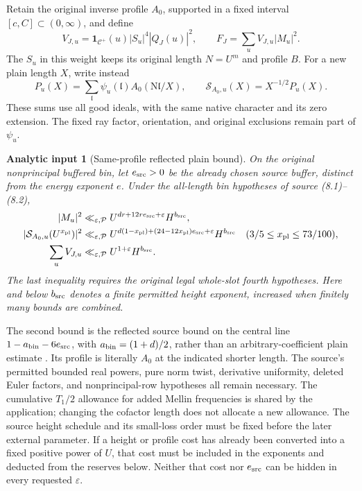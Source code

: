 \documentclass[11pt]{article}
\newtheorem{analyticinput}[theorem]{Analytic input}
\theoremstyle{definition}
\newcommand{\N}{\mathrm N}
\newcommand{\eps}{\varepsilon}
\newcommand{\Id}{\mathbf 1}
\newcommand{\Cplus}{\mathcal C^+}
\begin{document}
Retain the original inverse profile $A_0$, supported in a fixed interval
$[c,C]\subset(0,\infty)$, and define
\begin{equation}\label{bil-weight}
 V_{J,u}=\Id_{\Cplus}(u)|S_u|^4|Q_J(u)|^2,
 \qquad F_J=\sum_u V_{J,u}|M_u|^2.
\end{equation}
The $S_u$ in this weight keeps its original length $N=U^m$ and profile
$B$.  For a new plain length $X$, write instead
\begin{equation}\label{bil-plain-response}
 P_u(X)=\sum_{\mathfrak l}\psi_u(\mathfrak l)
                       A_0(\N\mathfrak l/X),
 \qquad \mathcal S_{A_0,u}(X)=X^{-1/2}P_u(X).
\end{equation}
These sums use all good ideals, with the same native character and its
zero extension.  The fixed ray factor, orientation, and original
exclusions remain part of $\psi_u$.

\begin{analyticinput}[Same-profile reflected plain bound]
\label{bil-reflected-input}
On the original nonprincipal buffered bin, let $e_{\rm src}>0$ be the
already chosen source buffer, distinct from the energy exponent $e$.
Under the all-length bin hypotheses of source (8.1)--(8.2),
\begin{align}
 |M_u|^2&\ll_{\eps,\mathcal P}
             U^{dr+12re_{\rm src}+\eps}H^{b_{\rm src}},
                   \label{bil-inverse-input}\\
 |\mathcal S_{A_0,u}(U^{x_{\rm pl}})|^2&\ll_{\eps,\mathcal P}
 U^{d(1-x_{\rm pl})+(24-12x_{\rm pl})e_{\rm src}+\eps}H^{b_{\rm src}}
       \quad(3/5\le x_{\rm pl}\le73/100),
                   \label{bil-reflected-bound}\\
 \sum_u V_{J,u}&\ll_{\eps,\mathcal P}
                      U^{1+\eps}H^{b_{\rm src}}.
                   \label{bil-fourth-mass}
\end{align}
The last inequality requires the original legal whole-slot fourth
hypotheses.  Here and below $b_{\rm src}$ denotes a finite permitted
height exponent, increased when finitely many bounds are combined.
\end{analyticinput}

The second bound is the reflected source bound on the central line
$1-a_{\rm bin}-6e_{\rm src}$, with $a_{\rm bin}=(1+d)/2$, rather than an arbitrary-coefficient
plain estimate \cite[printed pp.~57--58]{source-primary}.
Its profile is literally $A_0$ at the indicated shorter length.
The source's permitted bounded real powers, pure norm twist, derivative
uniformity, deleted Euler factors, and nonprincipal-row hypotheses all
remain necessary.  The cumulative $T_1/2$ allowance for added Mellin
frequencies is shared by the application; changing the cofactor length
does not allocate a new allowance.  The source height schedule and its
small-loss order must be fixed before the later external parameter.
If a height or profile cost has already been converted into a fixed
positive power of $U$, that cost must be included in the exponents and
deducted from the reserves below.  Neither that cost nor $e_{\rm src}$
can be hidden in every requested $\eps$.
\end{document}
